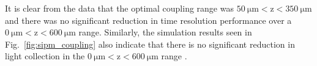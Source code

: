 It is clear from the data that the optimal coupling range was $\mathrm{50\ \mu m < z < 350\ \mu m}$ and there was no significant reduction in time resolution performance over a $\mathrm{0\ \mu m < z < 600\ \mu m}$ range.  Similarly, the simulation results seen in Fig.~\ref{fig:sipm_coupling} also indicate that there is no significant reduction in light collection in the $\mathrm{0\ \mu m < z < 600\ \mu m}$ range \cite{puneet_sim_talk}.
